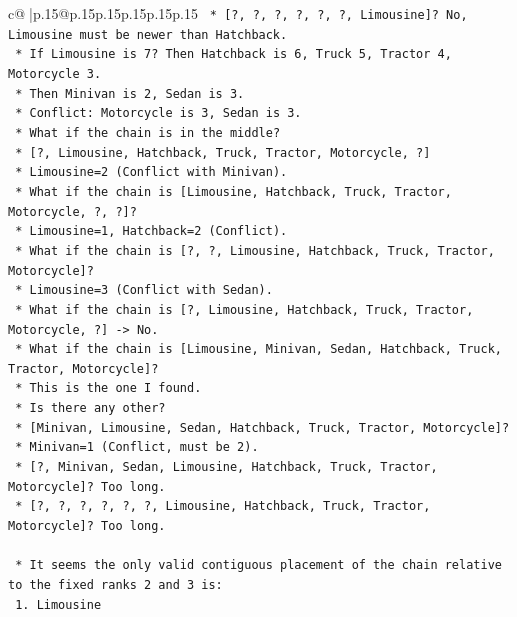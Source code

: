 \documentclass{article}
\begin{document}
{\begin{supertabular}{c@{$\;$}|p{.15\linewidth}@{}p{.15\linewidth}p{.15\linewidth}p{.15\linewidth}p{.15\linewidth}p{.15\linewidth}}
{{{\texttt{            *   {[}?, ?, ?, ?, ?, ?, Limousine{]}? No, Limousine must be newer than Hatchback.} \\
\texttt{            *   If Limousine is 7? Then Hatchback is 6, Truck 5, Tractor 4, Motorcycle 3.} \\
\texttt{            *   Then Minivan is 2, Sedan is 3.} \\
\texttt{            *   Conflict: Motorcycle is 3, Sedan is 3.} \\
\texttt{        *   What if the chain is in the middle?} \\
\texttt{            *   {[}?, Limousine, Hatchback, Truck, Tractor, Motorcycle, ?{]}} \\
\texttt{            *   Limousine=2 (Conflict with Minivan).} \\
\texttt{        *   What if the chain is {[}Limousine, Hatchback, Truck, Tractor, Motorcycle, ?, ?{]}?} \\
\texttt{            *   Limousine=1, Hatchback=2 (Conflict).} \\
\texttt{        *   What if the chain is {[}?, ?, Limousine, Hatchback, Truck, Tractor, Motorcycle{]}?} \\
\texttt{            *   Limousine=3 (Conflict with Sedan).} \\
\texttt{        *   What if the chain is {[}?, Limousine, Hatchback, Truck, Tractor, Motorcycle, ?{]} {-}> No.} \\
\texttt{        *   What if the chain is {[}Limousine, Minivan, Sedan, Hatchback, Truck, Tractor, Motorcycle{]}?} \\
\texttt{            *   This is the one I found.} \\
\texttt{            *   Is there any other?} \\
\texttt{            *   {[}Minivan, Limousine, Sedan, Hatchback, Truck, Tractor, Motorcycle{]}?} \\
\texttt{                *   Minivan=1 (Conflict, must be 2).} \\
\texttt{            *   {[}?, Minivan, Sedan, Limousine, Hatchback, Truck, Tractor, Motorcycle{]}? Too long.} \\
\texttt{            *   {[}?, ?, ?, ?, ?, ?, Limousine, Hatchback, Truck, Tractor, Motorcycle{]}? Too long.} \\
\\ 
\texttt{    *   It seems the only valid contiguous placement of the chain relative to the fixed ranks 2 and 3 is:} \\
\texttt{        1.  Limousine} \\
}}}
\end{supertabular}}
\end{document}
